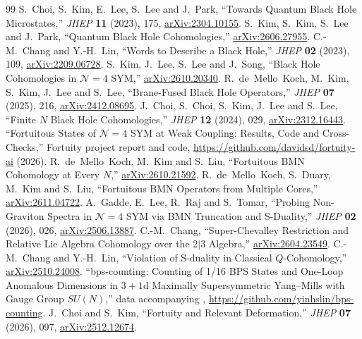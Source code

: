 \documentclass[11pt]{article}
\numberwithin{equation}{section}
\numberwithin{figure}{section}
\numberwithin{table}{section}
\begin{document}
\begin{thebibliography}{99}
S.~Choi, S.~Kim, E.~Lee, S.~Lee and J.~Park, ``Towards Quantum Black Hole Microstates,'' \emph{JHEP} \textbf{11} (2023), 175, \href{https://arxiv.org/abs/2304.10155}{arXiv:2304.10155}.
S.~Kim, S.~Kim, S.~Lee and J.~Park, ``Quantum Black Hole Cohomologies,'' \href{https://arxiv.org/abs/2606.27955}{arXiv:2606.27955}.
C.-M.~Chang and Y.-H.~Lin, ``Words to Describe a Black Hole,'' \emph{JHEP} \textbf{02} (2023), 109, \href{https://arxiv.org/abs/2209.06728}{arXiv:2209.06728}.
S.~Kim, J.~Lee, S.~Lee and J.~Song, ``Black Hole Cohomologies in $\mathcal N=4$ SYM,'' \href{https://arxiv.org/abs/2610.20340}{arXiv:2610.20340}.
R.~de~Mello~Koch, M.~Kim, S.~Kim, J.~Lee and S.~Lee, ``Brane-Fused Black Hole Operators,'' \emph{JHEP} \textbf{07} (2025), 216, \href{https://arxiv.org/abs/2412.08695}{arXiv:2412.08695}.
J.~Choi, S.~Choi, S.~Kim, J.~Lee and S.~Lee, ``Finite $N$ Black Hole Cohomologies,'' \emph{JHEP} \textbf{12} (2024), 029, \href{https://arxiv.org/abs/2312.16443}{arXiv:2312.16443}.
``Fortuitous States of $\mathcal N=4$ SYM at Weak Coupling: Results, Code and Cross-Checks,'' Fortuity project report and code, \url{https://github.com/davidsd/fortuity-ai} (2026).
R.~de~Mello~Koch, M.~Kim and S.~Liu, ``Fortuitous BMN Cohomology at Every $N$,'' \href{https://arxiv.org/abs/2610.21592}{arXiv:2610.21592}.
R.~de~Mello~Koch, S.~Duary, M.~Kim and S.~Liu, ``Fortuitous BMN Operators from Multiple Cores,'' \href{https://arxiv.org/abs/2611.04722}{arXiv:2611.04722}.
A.~Gadde, E.~Lee, R.~Raj and S.~Tomar, ``Probing Non-Graviton Spectra in $\mathcal N=4$ SYM via BMN Truncation and S-Duality,'' \emph{JHEP} \textbf{02} (2026), 026, \href{https://arxiv.org/abs/2506.13887}{arXiv:2506.13887}.
C.-M.~Chang, ``Super-Chevalley Restriction and Relative Lie Algebra Cohomology over the $2|3$ Algebra,'' \href{https://arxiv.org/abs/2604.23549}{arXiv:2604.23549}.
C.-M.~Chang and Y.-H.~Lin, ``Violation of S-duality in Classical $Q$-Cohomology,'' \href{https://arxiv.org/abs/2510.24008}{arXiv:2510.24008}.
``bps-counting: Counting of 1/16 BPS States and One-Loop Anomalous Dimensions in $3+1$d Maximally Supersymmetric Yang--Mills with Gauge Group $SU(N)$,'' data accompanying \cite{ChangLinWords}, \url{https://github.com/yinhslin/bps-counting}.
J.~Choi and S.~Kim, ``Fortuity and Relevant Deformation,'' \emph{JHEP} \textbf{07} (2026), 097, \href{https://arxiv.org/abs/2512.12674}{arXiv:2512.12674}.

\end{thebibliography}
\end{document}
